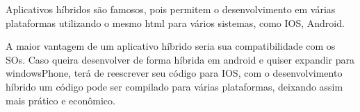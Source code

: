 Aplicativos híbridos são famosos, pois permitem o desenvolvimento em várias plataformas utilizando o mesmo html para vários sistemas, como IOS, Android.

A maior vantagem de um aplicativo híbrido seria sua compatibilidade com os SOs. Caso queira desenvolver de forma híbrida em android e quiser expandir para windowsPhone, terá de reescrever seu código para IOS, com o desenvolvimento híbrido um código pode ser compilado para várias plataformas, deixando assim mais prático e econômico.

\newpage 